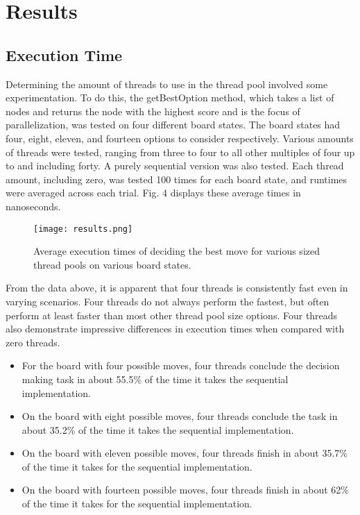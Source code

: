 \documentclass[conference]{IEEEtran}
\begin{document}
\section{Results}

\subsection{Execution Time}
Determining the amount of threads to use in the thread pool involved some experimentation. To do this, the getBestOption method, which takes a list of nodes and returns the node with the highest score and is the focus of parallelization, was tested on four different board states. The board states had four, eight, eleven, and fourteen options to consider respectively. Various amounts of threads were tested, ranging from three to four to all other multiples of four up to and including forty. A purely sequential version was also tested. Each thread amount, including zero, was tested 100 times for each board state, and runtimes were averaged across each trial. Fig. 4 displays these average times in nanoseconds.

\begin{figure}[htbp]
\centerline{\texttt{[image: results.png]}}
\caption{Average execution times of deciding the best move for various sized thread pools on various board states.}
\label{fig}
\end{figure}

From the data above, it is apparent that four threads is consistently fast even in varying scenarios. Four threads do not always perform the fastest, but often perform at least faster than most other thread pool size options. Four threads also demonstrate impressive differences in execution times when compared with zero threads.


\begin{itemize}
    \item For the board with four possible moves, four threads conclude the decision making task in about 55.5\% of the time it takes the sequential implementation.
    \item On the board with eight possible moves, four threads conclude the task in about 35.2\% of the time it takes the sequential implementation.
    \item On the board with eleven possible moves, four threads finish in about 35.7\% of the time it takes for the sequential implementation.
    \item On the board with fourteen possible moves, four threads finish in about 62\% of the time it takes for the sequential implementation.
\end{itemize}
\end{document}
